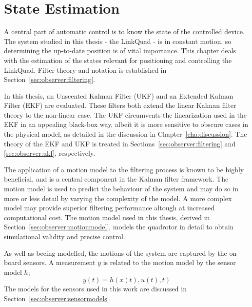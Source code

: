 \chapter{State Estimation}
\label{cha:observer}
    A central part of automatic control is to know the state of the controlled device.
    The system studied in this thesis - the LinkQuad - is in constant
    motion, so determining the up-to-date position is of vital importance.
    This chapter deals with the estimation of the states relevant for positioning
    and controlling the LinkQuad.
    Filter theory and notation is established in Section~\ref{sec:observer:filtering}.

    In this thesis, an Unscented Kalman Filter (UKF) and an Extended Kalman Filter (EKF) are evaluated.
    These filters both extend the linear Kalman filter theory to the non-linear case.
    The UKF circumvents the linearization used in the EKF in an appealing black-box way,
    albeit it is more sensitive to obscure cases in the physical model,
    as detailed in the discussion in Chapter~\ref{cha:discussion}.
    The theory of the EKF and UKF is treated in
    Sections~\ref{sec:observer:filtering} and \ref{sec:observer:ukf}, respectively.

    The application of a motion model to the filtering process is known to
    be highly beneficial, and is a central component in the Kalman filter framework.
    The motion model is used to predict the behaviour of the system and may do
    so in more or less detail by varying the complexity of the model.
    A more complex model may provide superior filtering performance altough
    at increased computational cost. The motion model used in this thesis,
    derived in Section~\ref{sec:observer:motionmodel}, models the quadrotor
    in detail to obtain simulational validity and precise control.

    As well as beeing modelled, the motions of the system are captured by the on-board sensors.
    A measurement $y$ is related to the motion model by the sensor model $h$;
    \begin{equation}
        y(t) = h(x(t),u(t),t)
    \end{equation}
    The models for the sensors used in this work are discussed in Section~\ref{sec:observer:sensormodels}.

    
    
    
    

